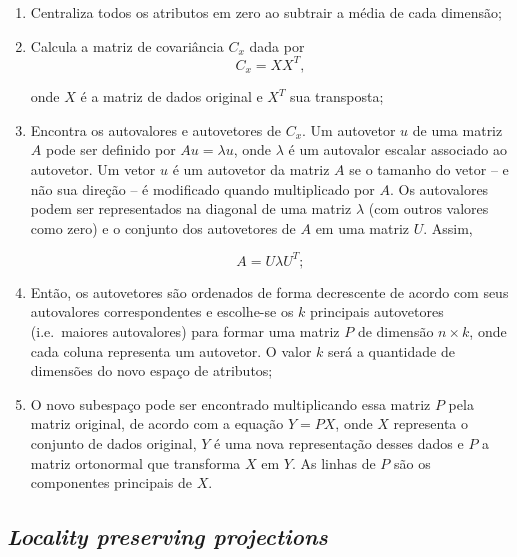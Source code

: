 \begin{enumerate}
\item Centraliza todos os atributos em zero ao subtrair a média de cada dimensão;
\item Calcula a matriz de covariância $C_x$ dada por
\begin{equation}
    C_x = X X^T,
\end{equation}

\noindent onde $X$ é a matriz de dados original e $X^T$ sua transposta;

\item Encontra os autovalores e autovetores de $C_x$. Um autovetor $u$ de uma matriz $A$ pode ser definido por $Au = \lambda u$, onde $\lambda$ é um autovalor escalar associado ao autovetor. Um vetor $u$ é um autovetor da matriz $A$ se o tamanho do vetor -- e não sua direção -- é modificado quando multiplicado por $A$. Os autovalores podem ser representados na diagonal de uma matriz $\lambda$ (com outros valores como zero) e o conjunto dos autovetores de $A$ em uma matriz $U$. Assim,

\begin{equation}
    A = U \lambda U^T;
\end{equation}

\item Então, os autovetores são ordenados de forma decrescente de acordo com seus autovalores correspondentes e escolhe-se os $k$ principais autovetores (i.e.\ maiores autovalores) para formar uma matriz $P$ de dimensão $n \times k$, onde cada coluna representa um autovetor. O valor $k$ será a quantidade de dimensões do novo espaço de atributos;
\item O novo subespaço pode ser encontrado multiplicando essa matriz $P$ pela matriz original, de acordo com a equação $Y = PX$, onde $X$ representa o conjunto de dados original, $Y$ é uma nova representação desses dados e $P$ a matriz ortonormal que transforma $X$ em $Y$. As linhas de $P$ são os componentes principais de $X$.
\end{enumerate}

\subsection{\textit{Locality preserving projections}}
\label{sec:lpp}

